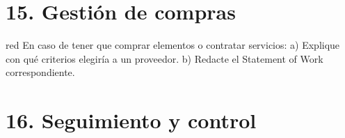\documentclass[11pt]{charter}
\begin{document}
\section{15. Gestión de compras}
\label{sec:compras}


\begin{consigna}{red}
En caso de tener que comprar elementos o contratar servicios:
a) Explique con qué criterios elegiría a un proveedor.
b) Redacte el Statement of Work correspondiente.
\end{consigna}

\section{16. Seguimiento y control}
\label{sec:seguimiento}


\end{document}
